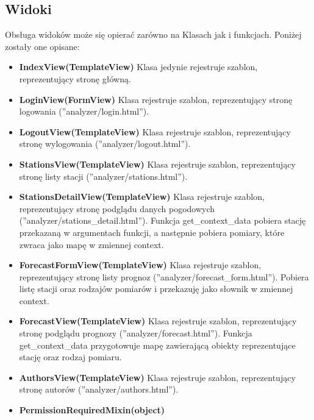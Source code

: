 \subsection{Widoki}
Obsługa widoków może się opierać zarówno na Klasach jak i funkcjach. Poniżej zostały one opisane:
\begin{itemize}
	\item \textbf{IndexView(TemplateView)}\newline
	Klasa jedynie rejestruje szablon, reprezentujący stronę główną.
	\item \textbf{LoginView(FormView)}\newline
	Klasa rejestruje szablon, reprezentujący stronę logowania (''analyzer/login.html''). 
	\item \textbf{LogoutView(TemplateView)}\newline
	Klasa rejestruje szablon, reprezentujący stronę wylogowania (''analyzer/logout.html''). 
	\item \textbf{StationsView(TemplateView)}\newline
	Klasa rejestruje szablon, reprezentujący stronę listy stacji (''analyzer/stations.html''). 
	\item \textbf{StationsDetailView(TemplateView)}\newline
	Klasa rejestruje szablon, reprezentujący stronę podglądu danych pogodowych (''analyzer/stations\_detail.html''). 
	Funkcja get\_context\_data pobiera stację przekazaną w argumentach funkcji, a następnie pobiera pomiary, które zwraca jako mapę w zmiennej context. 
	\item \textbf{ForecastFormView(TemplateView)}\newline
	Klasa rejestruje szablon, reprezentujący stronę listy prognoz (''analyzer/forecast\_form.html''). 
	Pobiera listę stacji oraz rodzajów pomiarów i przekazuję jako słownik w zmiennej context. 
	\item \textbf{ForecastView(TemplateView)}\newline
	Klasa rejestruje szablon, reprezentujący stronę podglądu prognozy (''analyzer/forecast.html''). 
	Funkcja get\_context\_data przygotowuje mapę zawierającą obiekty reprezentujące stację oraz rodzaj pomiaru.
	\item \textbf{AuthorsView(TemplateView)}\newline
	Klasa rejestruje szablon, reprezentujący stronę autorów (''analyzer/authors.html''). 
	\item \textbf{PermissionRequiredMixin(object)}\newline

\end{itemize}
